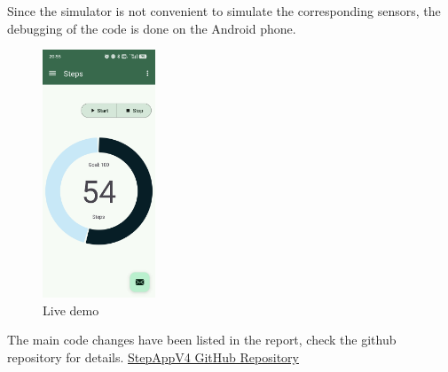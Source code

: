 \documentclass{article}
\begin{document}
Since the simulator is not convenient to simulate the corresponding sensors, the debugging of the code is done on the Android phone.
\begin{figure}[h]
    \centering
    \includegraphics[width=0.3\textwidth]{./pictures/debug.png}
    \caption{Live demo}
    \label{fig:example}
\end{figure}
The main code changes have been listed in the report, check the github repository for details.
\href{https://github.com/ZenWang00/Mobile-and-Wearable-Computing-SA-2024-2025/tree/main/MWC-StepAppV4-Startup-Code/StepAppV4}{StepAppV4 GitHub Repository}
\end{document}
